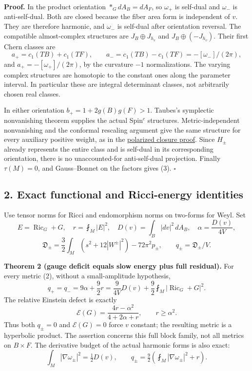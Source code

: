 \documentclass[
  11pt,
]{article}
\begin{document}
\textbf{Proof.} In the product orientation \(*_GdA_B=dA_F\), so
\(\omega_+\) is self-dual and \(\omega_-\) is anti-self-dual. Both are
closed because the fiber area form is independent of \(v\). They are
therefore harmonic, and \(\omega_-\) is self-dual after orientation
reversal. The compatible almost-complex structures are
\(J_B\oplus J_{h_v}\) and \(J_B\oplus(-J_{h_v})\). Their first Chern
classes are \[
 a_+=c_1(TB)+c_1(TF),\qquad
 a_-=c_1(TB)-c_1(TF)=-[\omega_-]/(2\pi),
\] and \(a_+=-[\omega_+]/(2\pi)\), by the curvature \(-1\)
normalizations. The varying complex structures are homotopic to the
constant ones along the parameter interval. In particular these are
integral determinant classes, not arbitrarily chosen real classes.

In either orientation \(b_+=1+2g(B)g(F)>1\). Taubes's symplectic
nonvanishing theorem supplies the actual Spin\(^c\) structures.
Metric-independent nonvanishing and the conformal rescaling argument
give the same structure for every auxiliary positive weight, as in the
\href{../mathematics/current/lebrun_stability_closure.md}{polarized
closure proof}. Since \(H_\pm\) already represents the entire class and
is self-dual in its corresponding orientation, there is no
unaccounted-for anti-self-dual projection. Finally \(\tau(M)=0\), and
Gauss--Bonnet on the factors gives (3). \(\square\)

\hypertarget{exact-functional-and-ricci-energy-identities}{%
\subsection{2. Exact functional and Ricci-energy
identities}\label{exact-functional-and-ricci-energy-identities}}

Use tensor norms for Ricci and endomorphism norms on two-forms for Weyl.
Set \[
 E=\operatorname{Ric}_G+G,\quad r=\fint_M|E|^2,\quad
 D(v)=\int_B|dv|^2\,dA_B,\quad \alpha=\frac{D(v)}{4V},
\] \[
 \mathfrak D_\pm=\frac32\int_M(s^2+12|W^\pm|^2)-72\pi^2p_\pm,
 \qquad q_\pm=\mathfrak D_\pm/V.                       \tag{4}
\]

\textbf{Theorem 2 (gauge deficit equals slow energy plus full
residual).} For every metric (2), without a small-amplitude hypothesis,
\[
 \boxed{q_+=q_-=9\alpha+\frac92r
      =\frac9{4V}D(v)+\frac92\fint_M|\operatorname{Ric}_G+G|^2.}
                                                               \tag{5}
\] The relative Einstein defect is exactly \[
 \boxed{\mathcal E(G)=\frac{4r-\alpha^2}{4+2\alpha+r},
            \qquad r\ge\alpha^2.}                    \tag{6}
\] Thus both \(q_\pm=0\) and \(\mathcal E(G)=0\) force \(v\) constant;
the resulting metric is a hyperbolic product. The assertion concerns
this full block family, not all metrics on \(B\times F\). The derivative
budget of the actual harmonic forms is also exact: \[
 \int_M|\nabla\omega_\pm|^2=\tfrac12D(v),\qquad
 q_\pm=\tfrac92\left(\fint_M|\nabla\omega_\pm|^2+r\right).
                                                               \tag{5a}
\]
\end{document}
